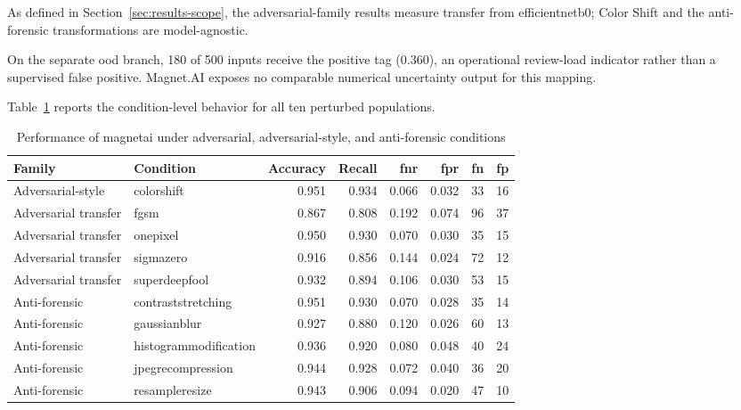 As defined in Section~\ref{sec:results-scope}, the adversarial-family results
measure transfer from \gls{efficientnetb0}; Color Shift and the anti-forensic
transformations are model-agnostic.

On the separate \gls{ood} branch, 180 of 500 inputs receive the positive tag
(0.360), an operational review-load indicator rather than a supervised false
positive. Magnet.AI exposes no comparable numerical uncertainty output for this
mapping.

Table~\ref{tab:results-magnet-attack-metrics} reports the condition-level
behavior for all ten perturbed populations.

\begin{table}[H]
\centering
\caption{Performance of \gls{magnetai} under adversarial, adversarial-style,
and anti-forensic conditions}
\label{tab:results-magnet-attack-metrics}
\scriptsize
\renewcommand{\arraystretch}{1.12}
\setlength{\tabcolsep}{4pt}
\begin{tabular}{@{}l l r r r r r r@{}}
\toprule
\textbf{Family} &
\textbf{Condition} &
\textbf{Accuracy} &
\textbf{Recall} &
\textbf{\gls{fnr}} &
\textbf{\gls{fpr}} &
\textbf{\acrshort{fn}} &
\textbf{\acrshort{fp}} \\
\midrule

Adversarial-style
&
\gls{colorshift}
&
0.951
&
0.934
&
0.066
&
0.032
&
33
&
16 \\

Adversarial transfer
&
\gls{fgsm}
&
0.867
&
0.808
&
0.192
&
0.074
&
96
&
37 \\

Adversarial transfer
&
\gls{onepixel}
&
0.950
&
0.930
&
0.070
&
0.030
&
35
&
15 \\

Adversarial transfer
&
\gls{sigmazero}
&
0.916
&
0.856
&
0.144
&
0.024
&
72
&
12 \\

Adversarial transfer
&
\gls{superdeepfool}
&
0.932
&
0.894
&
0.106
&
0.030
&
53
&
15 \\

\midrule

Anti-forensic
&
\gls{contraststretching}
&
0.951
&
0.930
&
0.070
&
0.028
&
35
&
14 \\

Anti-forensic
&
\gls{gaussianblur}
&
0.927
&
0.880
&
0.120
&
0.026
&
60
&
13 \\

Anti-forensic
&
\gls{histogrammodification}
&
0.936
&
0.920
&
0.080
&
0.048
&
40
&
24 \\

Anti-forensic
&
\gls{jpegrecompression}
&
0.944
&
0.928
&
0.072
&
0.040
&
36
&
20 \\

Anti-forensic
&
\gls{resampleresize}
&
0.943
&
0.906
&
0.094
&
0.020
&
47
&
10 \\

\bottomrule
\end{tabular}
\end{table}

